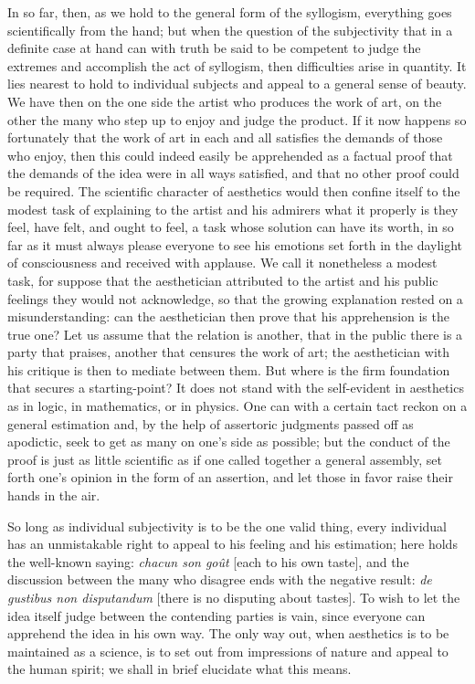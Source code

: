 \documentclass[12pt]{book}
\begin{document}
In so far, then, as we hold to the general form of the syllogism, everything goes scientifically
from the hand; but when the question of the subjectivity that in a definite case at hand can with
truth be said to be competent to judge the extremes and accomplish the act of syllogism, then
difficulties arise in quantity. It lies nearest to hold to individual subjects and appeal to a
general sense of beauty. We have then on the one side the artist who produces the work of art, on
the other the many who step up to enjoy and judge the product. If it now happens so fortunately
that the work of art in each and all satisfies the demands of those who enjoy, then this could
indeed easily be apprehended as a factual proof that the demands of the idea were in all ways
satisfied, and that no other proof could be required. The scientific character of aesthetics
would then confine itself to the modest task of explaining to the artist and his admirers what
it properly is they feel, have felt, and ought to feel, a task whose solution can have its worth,
in so far as it must always please everyone to see his emotions set forth in the daylight of
consciousness and received with applause. We call it nonetheless a modest task, for suppose that
the aesthetician attributed to the artist and his public feelings they would not acknowledge, so
that the growing explanation rested on a misunderstanding: can the aesthetician then prove that
his apprehension is the true one? Let us assume that the relation is another, that in the public
there is a party that praises, another that censures the work of art; the aesthetician with his
critique is then to mediate between them. But where is the firm foundation that secures a
starting-point? It does not stand with the self-evident in aesthetics as in logic, in
mathematics, or in physics. One can with a certain tact reckon on a general estimation and, by
the help of assertoric judgments passed off as apodictic, seek to get as many on one's side as
possible; but the conduct of the proof is just as little scientific as if one called together a
general assembly, set forth one's opinion in the form of an assertion, and let those in favor
raise their hands in the air.

So long as individual subjectivity is to be the one valid thing, every individual has an
unmistakable right to appeal to his feeling and his estimation; here holds the well-known saying:
\textit{chacun son goût} [each to his own taste], and the discussion between the many who
disagree ends with the negative result: \textit{de gustibus non disputandum} [there is no
disputing about tastes]. To wish to let the idea itself judge between the contending parties is
vain, since everyone can apprehend the idea in his own way. The only way out, when aesthetics is
to be maintained as a science, is to set out from impressions of nature and appeal to the human
spirit; we shall in brief elucidate what this means.
\end{document}
